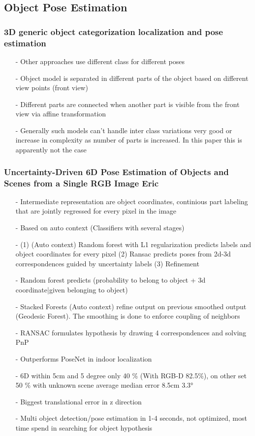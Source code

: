 \documentclass{article}
\begin{document}
\begin{multicols}{2}
	 	\subsection{Object Pose Estimation}
	 	\subsubsection{3D generic object categorization localization and pose estimation \cite{Savarese}}
	 	\begin{itemize}
	 		\item[-] Other approaches use different class for different poses
	 		\item[-] Object model is separated in different parts of the object based on different view points (front view)
	 		\item[-] Different parts are connected when another part is visible from the front view via affine transformation
	 		\item[-] Generally such models can't handle inter class variations very good or increase in complexity as number of parts is increased. In this paper this is apparently not the case
	 	\end{itemize}
	 	\subsubsection{Uncertainty-Driven 6D Pose Estimation of Objects and Scenes from a Single RGB Image
	 		Eric \cite{Brachmann}}
	 	\begin{itemize}
	 	\item[-] Intermediate representation are object coordinates, continious part labeling that are jointly regressed for every pixel in the image
	 	\item[-] Based on auto context (Classifiers with several stages)
	 	\item[-] (1) (Auto context) Random forest with L1 regularization predicts labels and object coordinates for every pixel (2) Ransac predicts poses from 2d-3d correspondences guided by uncertainty labels
	 	(3) Refinement
	 	\item[-] Random forest predicts (probability to belong to object + 3d coordinate|given belonging to object)
	 	\item[-] Stacked Forests (Auto context) refine output on previous smoothed output (Geodesic Forest). The smoothing is done to enforce coupling of neighbors 
	 	\item[-] RANSAC formulates hypothesis by drawing 4 correspondences and solving PnP
	 	\item[-] Outperforms PoseNet in indoor localization
	 	\item[-] 6D within 5cm and 5 degree only 40 \% (With RGB-D 82.5\%), on other set 50 \% with unknown scene average median error 8.5cm 3.3°
	 	\item[-] Biggest translational error in z direction
	 	\item[-] Multi object detection/pose estimation in 1-4 seconds, not optimized, most time spend in searching for object hypothesis
	 	\end{itemize}

\end{multicols}
\end{document}
